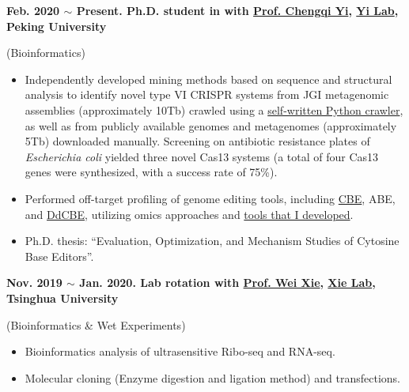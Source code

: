 \textbf{
    Feb. 2020 $\sim$ Present. Ph.D. student in  with \href{https://www.bio.pku.edu.cn/enhomes/news/teacher_dis/91.html}{Prof. Chengqi Yi}, \href{https://yilab.org.cn/}{Yi Lab}, Peking University
}

(Bioinformatics)

\begin{itemize}
    \item Independently developed mining methods based on sequence and structural analysis to 
    identify novel type VI CRISPR systems from 
    JGI metagenomic assemblies (approximately 10Tb) crawled using a 
    \href{https://github.com/hermanzhaozzzz/bioat/blob/master/src/bioat/metatools.py}{self-written Python crawler}, 
    as well as from publicly available genomes and metagenomes (approximately 5Tb) downloaded manually.
    Screening on antibiotic resistance plates of \textit{Escherichia coli} 
    yielded three novel Cas13 systems (a total of four Cas13 genes were synthesized, 
    with a success rate of 75\%).

    \item Performed off-target profiling of genome editing tools, including 
    \href{https://scholar.google.com/citations?view_op=view_citation&hl=zh-CN&user=ojSVoWQAAAAJ&citation_for_view=ojSVoWQAAAAJ:zYLM7Y9cAGgC}{CBE}\cite{lei2021detect,lei2023detect,rao2023characterizing}, 
    ABE, 
    and \href{https://scholar.google.com/citations?view_op=view_citation&hl=zh-CN&user=ojSVoWQAAAAJ&citation_for_view=ojSVoWQAAAAJ:Y0pCki6q_DkC}{DdCBE}\cite{lei2022mitochondrial,lei2023detect,rao2023characterizing}, 
    utilizing omics approaches 
    and \href{https://github.com/hermanzhaozzzz?tab=repositories&q=snakepipes&type=&language=&sort=}
    {tools that I developed}.
    \item Ph.D. thesis: ``Evaluation, Optimization, and Mechanism Studies of Cytosine Base Editors''.
    
\end{itemize}

\textbf{
    Nov. 2019 $\sim$ Jan. 2020. Lab rotation with \href{https://life.tsinghua.edu.cn/lifeen/info/1034/1077.htm}{Prof. Wei Xie}, \href{http://www.xielab.org.cn/}{Xie Lab}, Tsinghua University
}

(Bioinformatics \& Wet Experiments)

\begin{itemize}
    \item Bioinformatics analysis of ultrasensitive Ribo-seq and RNA-seq.
    \item Molecular cloning (Enzyme digestion and ligation method) and transfections.
\end{itemize}

